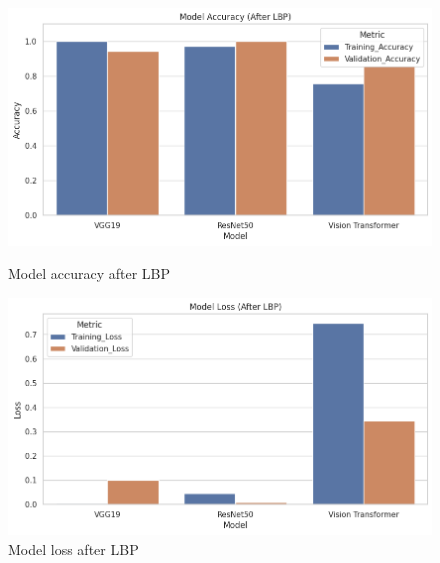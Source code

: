 \documentclass{ijclclp}
\begin{document}
\begin{flushleft}
\begin{figure}[htbp]
    \centering
    \begin{minipage}[b]{0.48\textwidth}
    \includegraphics[width=\textwidth]{image19.png}
    
    \caption{Model accuracy after LBP}
    \end{minipage}
    \hfill
    \begin{minipage}[b]{0.48\textwidth}
    \includegraphics[width=\textwidth]{image20.png}
    \caption{Model loss after LBP}
    \end{minipage}
\end{figure}
\vspace{10cm}
\end{flushleft}
\end{document}
